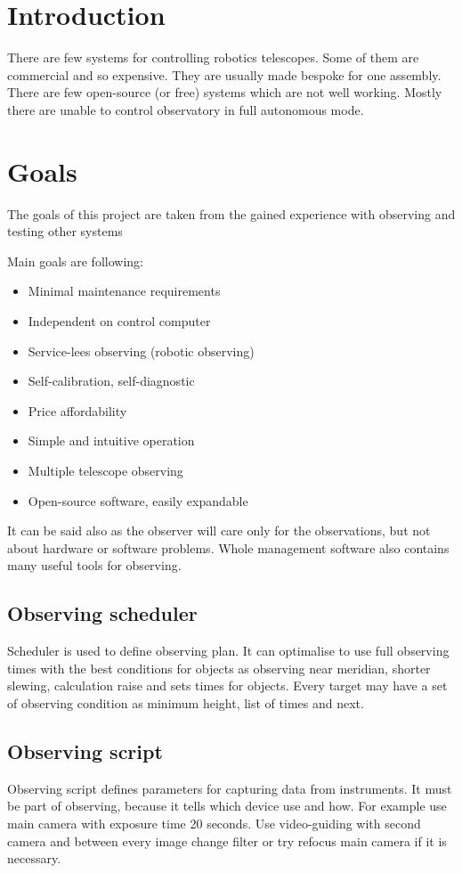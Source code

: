\documentclass{poster16}
\begin{document}

\section{Introduction}
There are few systems for controlling robotics telescopes. Some of them are commercial and so expensive. They are usually made bespoke for one assembly. There are few open-source (or free) systems which are not well working. Mostly there are unable to control observatory in full autonomous mode.

\section{Goals}
The goals of this project are taken from the gained experience with observing and testing other systems

Main goals are following:
\begin{itemize}
\item Minimal maintenance requirements
\item Independent on control computer
\item Service-lees observing (robotic observing)
\item Self-calibration, self-diagnostic
\item Price affordability
\item Simple and intuitive operation
\item Multiple telescope observing
\item Open-source software, easily expandable
\end{itemize}

It can be said also as the observer will care only for the observations, but not about hardware or software problems. Whole management software also contains many useful tools for observing.

\subsection{Observing scheduler}
Scheduler is used to define observing plan. It can optimalise to use full observing times with the best conditions for objects as observing near meridian, shorter slewing, calculation raise and sets times for objects. Every target may have a set of observing condition as minimum height, list of times and next.

\subsection{Observing script}
Observing script defines parameters for capturing data from instruments. It must be part of observing, because it tells which device use and how. For example use main camera with exposure time 20 seconds. Use video-guiding with second camera and between every image change filter or try refocus main camera if it is necessary.
\end{document}
